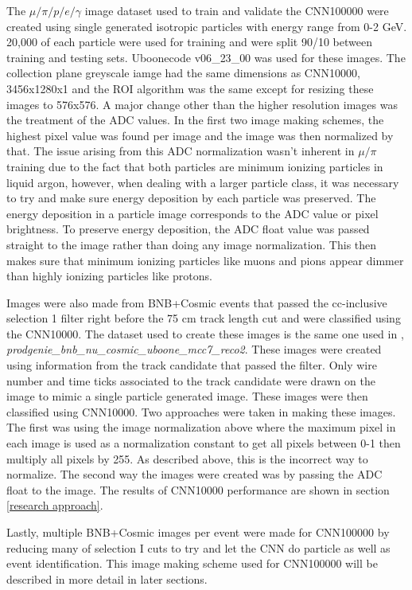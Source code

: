 The $\mu/\pi/p/e/\gamma$ image dataset used to train and validate the CNN100000 were created using single generated isotropic particles with energy range from 0-2 GeV. 20,000 of each particle were used for training and were split 90/10 between training and testing sets. Uboonecode v06{\_}23{\_}00 was used for these images. The collection plane greyscale iamge had the same dimensions as CNN10000, 3456x1280x1 and the ROI algorithm was the same except for resizing these images to 576x576. A major change other than the higher resolution images was the treatment of the ADC values. In the first two image making schemes, the highest pixel value was found per image and the image was then normalized by that. The issue arising from this ADC normalization wasn't inherent in $\mu/\pi$ training due to the fact that both particles are minimum ionizing particles in liquid argon, however, when dealing with a larger particle class, it was necessary to try and make sure energy deposition by each particle was preserved. The energy deposition in a particle image corresponds to the ADC value or pixel brightness. To preserve energy deposition, the ADC float value was passed straight to the image rather than doing any image normalization. This then makes sure that minimum ionizing particles like muons and pions appear dimmer than highly ionizing particles like protons.  

Images were also made from BNB+Cosmic events that passed the cc-inclusive selection 1 filter right before the 75 cm track length cut and were classified using the CNN10000. The dataset used to create these images is the same one used in \cite{cc-inclusive}, \textit{prodgenie{\_}bnb{\_}nu{\_}cosmic{\_}uboone{\_}mcc7{\_}reco2}. These images were created using information from the track candidate that passed the filter. Only wire number and time ticks associated to the track candidate were drawn on the image to mimic a single particle generated image. These images were then classified using CNN10000. Two approaches were taken in making these images. The first was using the image normalization above where the maximum pixel in each image is used as a normalization constant to get all pixels between 0-1 then multiply all pixels by 255. As described above, this is the incorrect way to normalize. The second way the images were created was by passing the ADC float to the image. The results of CNN10000 performance are shown in section \ref{research approach}. 

Lastly, multiple BNB+Cosmic images per event were made for CNN100000 by reducing many of selection I cuts to try and let the CNN do particle as well as event identification. This image making scheme used for CNN100000 will be described in more detail in later sections. 

